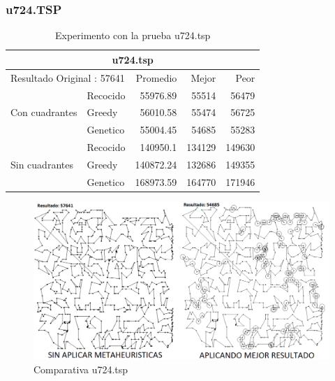 \subsubsection{u724.TSP}
\begin{table}[hbtp]
 \centering 
	\begin{tabular}{ | l   l | r | r | r |   }
         \hline\multicolumn{5}{|c|}{ \rowcolor[gray]{0.8}u724.tsp } \\\hline
         \multicolumn{2}{|l|}{Resultado Original : 57641} & Promedio & Mejor & Peor \\ \hline
                        & Recocido  & 55976.89 & 55514 & 56479  \\ 
         Con cuadrantes & Greedy    & 56010.58 & 55474 & 56725  \\ 
                        & Genetico  & 55004.45 & 54685 & 55283  \\ \hline
                        & Recocido  & 140950.1 & 134129 & 149630   \\ 
         Sin cuadrantes & Greedy    & 140872.24 & 132686 & 149355   \\ 
                        & Genetico  & 168973.59 & 164770 & 171946   \\ \hline
    \end{tabular}
    \caption{Experimento con la prueba u724.tsp}
    \label{table:EXP_u724.tsp}
\end{table}	
\begin{figure}[hbtp]
    \centering
        \includegraphics[width=1\textwidth]{PruebasResultados/Experimentos_Comparativas/u724.png}
        \caption{Comparativa u724.tsp}
        \label{fig:u724_comparativa.png}
\end{figure}
